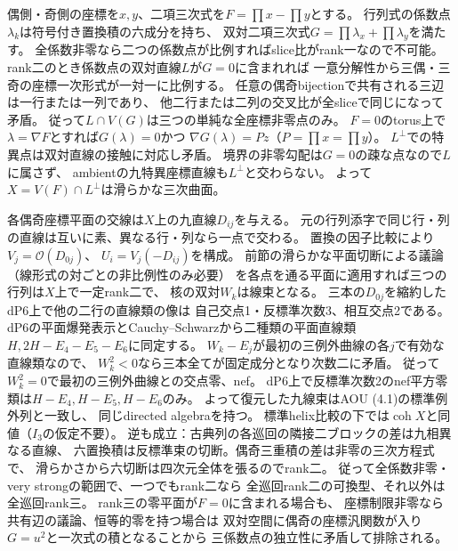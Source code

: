 \documentclass[11pt,a4paper]{ltjsarticle}
\newcommand{\coh}{\operatorname{coh}}
\begin{document}
偶側・奇側の座標を$x,y$、二項三次式を$F=\prod x-\prod y$とする。
行列式の係数点$\lambda_k$は符号付き置換積の六成分を持ち、
双対二項三次式$G=\prod\lambda_x+\prod\lambda_y$を満たす。
全係数非零なら二つの係数点が比例すればslice比がrank一なので不可能。
rank二のとき係数点の双対直線$L$が$G=0$に含まれれば
一意分解性から三偶・三奇の座標一次形式が一対一に比例する。
任意の偶奇bijectionで共有される三辺は一行または一列であり、
他二行または二列の交叉比が全sliceで同じになって矛盾。
従って$L\cap V(G)$は三つの単純な全座標非零点のみ。
$F=0$のtorus上で$\lambda=\nabla F$とすれば$G(\lambda)=0$かつ
$\nabla G(\lambda)=Pz$（$P=\prod x=\prod y$）。
$L^\perp$での特異点は双対直線の接触に対応し矛盾。
境界の非零勾配は$G=0$の疎な点なので$L$に属さず、
ambientの九特異座標直線も$L^\perp$と交わらない。
よって$X=V(F)\cap L^\perp$は滑らかな三次曲面。

各偶奇座標平面の交線は$X$上の九直線$D_{ij}$を与える。
元の行列添字で同じ行・列の直線は互いに素、異なる行・列なら一点で交わる。
置換の因子比較により$V_j=\mathcal O(D_{0j})$、
$U_i=V_j(-D_{ij})$を構成。
前節の滑らかな平面切断による議論（線形式の対ごとの非比例性のみ必要）
を各点を通る平面に適用すれば三つの行列は$X$上で一定rank二で、
核の双対$W_k$は線束となる。
三本の$D_{0j}$を縮約したdP6上で他の二行の直線類の像は
自己交点1・反標準次数3、相互交点2である。
dP6の平面爆発表示とCauchy--Schwarzから二種類の平面直線類
$H,2H-E_4-E_5-E_6$に同定する。
$W_k-E_j$が最初の三例外曲線の各$j$で有効な直線類なので、
$W_k^2<0$なら三本全てが固定成分となり次数二に矛盾。
従って$W_k^2=0$で最初の三例外曲線との交点零、nef。
dP6上で反標準次数2のnef平方零類は$H-E_4,H-E_5,H-E_6$のみ。
よって復元した九線束はAOU (4.1)の標準例外列と一致し、
同じdirected algebraを持つ。
標準helix比較の下では$\coh X$と同値（$I_3$の仮定不要）。
逆も成立：古典列の各巡回の隣接二ブロックの差は九相異なる直線、
六置換積は反標準束の切断。偶奇三重積の差は非零の三次方程式で、
滑らかさから六切断は四次元全体を張るのでrank二。
従って全係数非零・very strongの範囲で、一つでもrank二なら
全巡回rank二の可換型、それ以外は全巡回rank三。
rank三の零平面が$F=0$に含まれる場合も、
座標制限非零なら共有辺の議論、恒等的零を持つ場合は
双対空間に偶奇の座標汎関数が入り$G=u^2$と一次式の積となることから
三係数点の独立性に矛盾して排除される。
\end{document}
